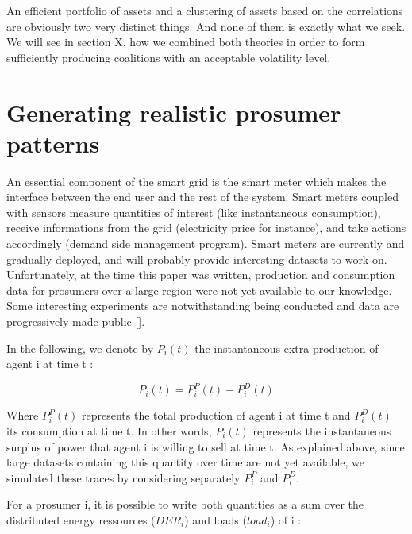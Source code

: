 \documentclass[conference]{IEEEtran}
\begin{document}
An efficient portfolio of assets and a clustering of assets based on the correlations are obviously two very distinct things. And none of them is exactly what we seek. We will see in section X, how we combined both theories in order to form sufficiently producing coalitions with an acceptable volatility level.

%
%

\section{Generating realistic prosumer patterns}
\label{sec:data}

An essential component of the smart grid is the smart meter which makes the interface between the end user and the rest of the system. Smart meters coupled with sensors measure quantities of interest (like instantaneous consumption), receive informations from the grid (electricity price for instance), and take actions accordingly (demand side management program). Smart meters are currently and gradually deployed, and will probably provide interesting datasets to work on. Unfortunately, at the time this paper was written, production and consumption data for prosumers over a large region were not yet available to our knowledge. Some interesting experiments are notwithstanding being conducted and data are progressively made public []. 

In the following, we denote by $ P_{i}(t) $ the instantaneous extra-production of agent i at time t :

\begin{equation}
P_{i}(t) = P_{i}^{P}(t) - P_{i}^{D}(t)
\end{equation}

Where $ P_{i}^{P}(t) $ represents the total production of agent i at time t and $ P_{i}^{D}(t) $ its consumption at time t. In other words, $ P_{i}(t) $ represents the instantaneous surplus of power that agent i is willing to sell at time t. As explained above, since large datasets containing this quantity over time are not yet available, we simulated these traces by considering separately $ P_{i}^{P} $ and $ P_{i}^{D} $.

For a prosumer i, it is possible to write both quantities as a sum over the distributed energy ressources ($ DER_{i} $) and loads ($ load_{i} $) of i : 
\end{document}
